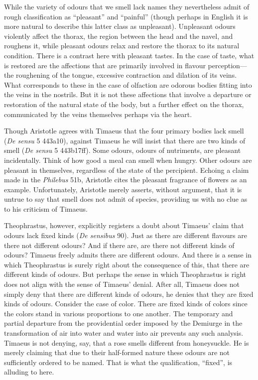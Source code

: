 While the variety of odours that we smell lack names they nevertheless admit of rough classification as ``pleasant'' and ``painful'' (though perhaps in English it is more natural to describe this latter class as unpleasant). Unpleasant odours violently affect the thorax, the region between the head and the navel, and roughens it, while pleasant odours relax and restore the thorax to its natural condition. There is a contrast here with pleasant tastes. In the case of taste, what is restored are the affections that are primarily involved in flavour perception---the roughening of the tongue, excessive contraction and dilation of its veins. What corresponds to these in the case of olfaction are odorous bodies fitting into the veins in the nostrils. But it is not these affections that involve a departure or restoration of the natural state of the body, but a further effect on the thorax, communicated by the veins themselves perhaps via the heart.

Though Aristotle agrees with Timaeus that the four primary bodies lack smell (\emph{De sensu} 5 443a10), against Timaeus he will insist that there are two kinds of smell (\emph{De sensu} 5 443b17ff). Some odours, odours of nutriments, are pleasant incidentally. Think of how good a meal can smell when hungry. Other odours are pleasant in themselves, regardless of the state of the percipient. Echoing a claim made in the \emph{Philebus} 51b, Aristotle cites the pleasant fragrance of flowers as an example. Unfortunately, Aristotle merely asserts, without argument, that it is untrue to say that smell does not admit of species, providing us with no clue as to his criticism of Timaeus. 

Theophrastus, however, explicitly registers a doubt about Timaeus' claim that odours lack fixed kinds (\emph{De sensibus} 90). Just as there are different flavours are there not different odours? And if there are, are there not different kinds of odours? Timaeus freely admits there are different odours. And there is a sense in which Theophrastus is surely right about the consequence of this, that there are different kinds of odours. But perhaps the sense in which Theophrastus is right does not align with the sense of Timaeus' denial. After all, Timaeus does not simply deny that there are different kinds of odours, he denies that they are fixed kinds of odours. Consider the case of color. There are fixed kinds of colors since the colors stand in various proportions to one another. The temporary and partial departure from the providential order imposed by the Demiurge in the transformation of air into water and water into air prevents any such analysis. Timaeus is not denying, say, that a rose smells different from honeysuckle. He is merely claiming that due to their half-formed nature these odours are not sufficiently ordered to be named. That is what the qualification, ``fixed'', is alluding to here.

